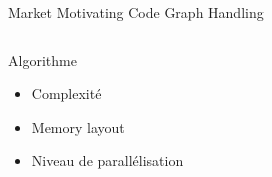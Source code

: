 %
\begin{Frame}{Market Motivating Code Graph Handling}
  \begin{columns}[t]
    \begin{column}{5cm} %
      \begin{block}{Algorithme}
        \begin{itemize}
        \item Complexité
        \item Memory layout
        \item Niveau de parallélisation
        \end{itemize}
      \end{block} 
    \end{column}
    
  \end{columns}  
\end{Frame}


